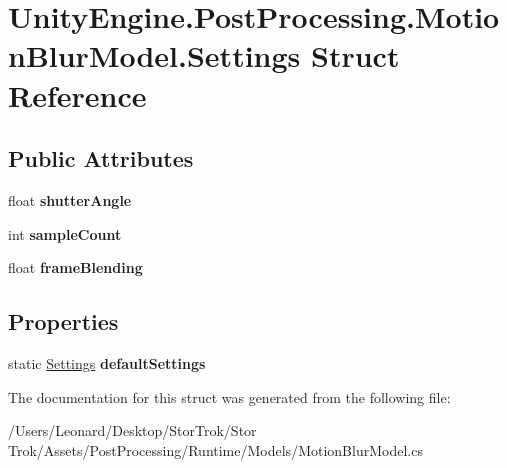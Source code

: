 \hypertarget{struct_unity_engine_1_1_post_processing_1_1_motion_blur_model_1_1_settings}{}\section{Unity\+Engine.\+Post\+Processing.\+Motion\+Blur\+Model.\+Settings Struct Reference}
\label{struct_unity_engine_1_1_post_processing_1_1_motion_blur_model_1_1_settings}
\subsection*{Public Attributes}
\begin{DoxyCompactItemize}
\item 
\mbox{\label{struct_unity_engine_1_1_post_processing_1_1_motion_blur_model_1_1_settings_aa87f06f32cbabf70b57bb5d1222a7289}} 
float {\bfseries shutter\+Angle}
\item 
\mbox{\label{struct_unity_engine_1_1_post_processing_1_1_motion_blur_model_1_1_settings_a5d2163b0f3cdf31d768131d211608523}} 
int {\bfseries sample\+Count}
\item 
\mbox{\label{struct_unity_engine_1_1_post_processing_1_1_motion_blur_model_1_1_settings_a1342d04370729632c1e169d6e909a601}} 
float {\bfseries frame\+Blending}
\end{DoxyCompactItemize}
\subsection*{Properties}
\begin{DoxyCompactItemize}
\item 
\mbox{\label{struct_unity_engine_1_1_post_processing_1_1_motion_blur_model_1_1_settings_a9cab7b33d1ea48a1a47b58d93958dbe0}} 
static \hyperlink{struct_unity_engine_1_1_post_processing_1_1_motion_blur_model_1_1_settings}{Settings} {\bfseries default\+Settings}
\end{DoxyCompactItemize}


The documentation for this struct was generated from the following file\+:\begin{DoxyCompactItemize}
\item 
/\+Users/\+Leonard/\+Desktop/\+Stor\+Trok/\+Stor Trok/\+Assets/\+Post\+Processing/\+Runtime/\+Models/Motion\+Blur\+Model.\+cs\end{DoxyCompactItemize}
